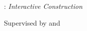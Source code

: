 \thispagestyle{empty}

\hfill

\vfill

\noindent\myName: \newline \emph{Interactive Construction} %
\newline \myTime

\bigskip

\noindent Supervised by \mySupervisor and \myProf 

%
%
%
